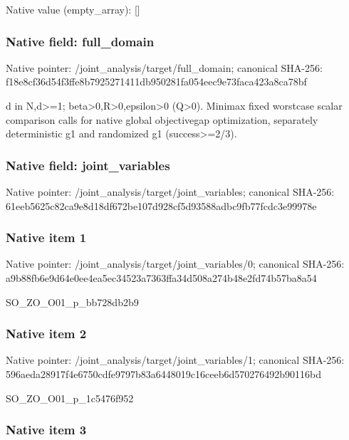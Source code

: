 \documentclass[10pt,a4paper]{article}
\begin{document}
Native value (empty\_array): []



\subsubsection{Native field: full\_domain}


Native pointer: /joint\_analysis/target/full\_domain; canonical SHA-256: f18e8cf36d54f3ffe8b79252\allowbreak{}71411db950281fa054eec9e7\allowbreak{}3faca423a8ca78bf


d in N,d>=1; beta>0,R>0,epsilon>0 (Q>0). Minimax fixed worstcase scalar comparison calls for native global objectivegap optimization, separately deterministic g1 and randomized g1 (success>=2/3).


\subsubsection{Native field: joint\_variables}


Native pointer: /joint\_analysis/target/joint\_variables; canonical SHA-256: 61eeb5625c82ca9e8d18df67\allowbreak{}2be107d928cf5d93588adbc9\allowbreak{}fb77fcdc3e99978e



\subsubsection{Native item 1}


Native pointer: /joint\_analysis/target/j\allowbreak{}oint\_variables/0; canonical SHA-256: a9b88fb6e9d64e0ee4ea5ec3\allowbreak{}4523a7363ffa34d508a274b4\allowbreak{}8e2fd74b57ba8a54


SO\_ZO\_O01\_p\_bb728db2b9


\subsubsection{Native item 2}


Native pointer: /joint\_analysis/target/j\allowbreak{}oint\_variables/1; canonical SHA-256: 596aeda28917f4e6750cdfe9\allowbreak{}797b83a6448019c16ceeb6d5\allowbreak{}70276492b90116bd


SO\_ZO\_O01\_p\_1c5476f952


\subsubsection{Native item 3}
\end{document}
